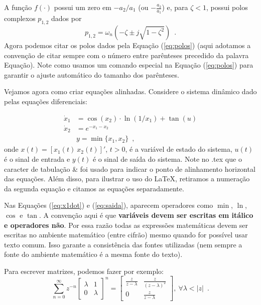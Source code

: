 A função $f(\cdot)$ possui um zero em $-a_2/a_1$ (ou $-\frac{a_2}{a_1}$) e, para $\zeta<1$, possui polos complexos $p_{1,2}$ dados por
\begin{equation}
\label{eq:polos}
p_{1,2}=\omega_n \left(-\zeta\pm j\sqrt{1-\zeta^2}\right)
\enspace.
\end{equation}
Agora podemos citar os polos dados pela Equação (\ref{eq:polos}) (aqui adotamos a convenção de citar sempre com o número entre parênteses precedido da palavra Equação). Note como usamos um comando especial na Equação (\ref{eq:polos}) para garantir o ajuste automático do tamanho dos parênteses.

Vejamos agora como criar equações alinhadas. Considere o sistema dinâmico dado pelas equações diferenciais:

\begin{align}
\dot{x}_1 & = \cos(x_2)\cdot\ln(1/x_1)+\tan(u) \label{eq:x1dot} \\
\dot{x}_2 & = e^{-x_1-x_2} \nonumber \\
& y  = \min\{x_1,x_2\}  \label{eq:saida}
\enspace,
\end{align}
onde $x(t)=[x_1(t) ~ x_2(t)]'$, $t>0$, é a variável de estado do sistema, $u(t)$ é o sinal de entrada e $y(t)$ é o sinal de saída do sistema. Note no .tex que o caracter de tabulação \textsf{\&} foi usado para indicar o ponto de alinhamento horizontal das equações. Além disso, para ilustrar o uso do \LaTeX, retiramos a numeração da segunda equação e citamos as equações separadamente.

Nas Equações (\ref{eq:x1dot}) e (\ref{eq:saida}), aparecem operadores como $\min$, $\ln$, $\cos$ e $\tan$. A convenção aqui é que \textbf{variáveis devem ser escritas em itálico e operadores não}. Por essa razão todas as expressões matemáticas devem ser escritas no ambiente matemático (entre cifrão) mesmo quando for possível usar texto comum. Isso garante a consistência das fontes utilizadas (nem sempre a fonte do ambiente matemático é a mesma fonte do texto). 

Para escrever matrizes, podemos fazer por exemplo:
\[
\sum_{n=0}^{\infty}z^{-n}\left[\begin{array}{cc}
\lambda & 1 \\
0 & \lambda
\end{array}\right]^n=
\left[\begin{array}{cc}
\frac{z}{z-\lambda} & \frac{z}{(z-\lambda)^2} \\
0 & \frac{z}{z-\lambda}
\end{array}\right]
,~\forall \lambda<|z|
\enspace.
\]

